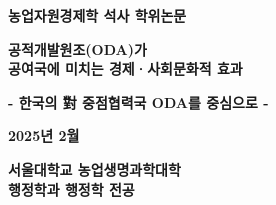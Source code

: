 
\begin{titlepage}
    \begin{center}

        {\fontsize{14pt}{\baselineskip}\selectfont \textbf{농업자원경제학 석사 학위논문}}\\
        \vspace{4.3cm}

        {\fontsize{22pt}{\baselineskip}\selectfont \textbf{공적개발원조(ODA)가}}\\
        \vspace{.6cm}
        {\fontsize{22pt}{\baselineskip}\selectfont \textbf{공여국에 미치는 경제·사회문화적 효과}}\\
        \vspace{.6cm}

        {\fontsize{16pt}{\baselineskip}\selectfont \textbf{- 한국의 {\hanjafont 對} 중점협력국 ODA를 중심으로 -}}\\
        \vspace{5.8cm}

        {\fontsize{14pt}{\baselineskip}\selectfont \textbf{2025년 2월}}\\
        \vspace{3.5cm}

        
        {\fontsize{16pt}{\baselineskip}\selectfont \textbf{서울대학교 농업생명과학대학}}\\
        \vspace{.4cm}
        {\fontsize{14pt}{\baselineskip}\selectfont \textbf{행정학과 행정학 전공}}\\
        \vspace{.4cm}


        \\

    \end{center}
\end{titlepage}

